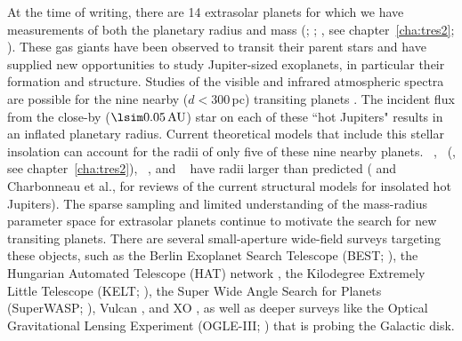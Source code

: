 At the time of writing, there are 14 extrasolar planets for which we have measurements of both the planetary radius and mass (\citealp*[see][for a review]{Charbonneau_Brown_Burrows:PPV:2007a}; \citealt{McCullough_Stys_Valenti:apj:2006a}; \citealt{ODonovan_Charbonneau_Mandushev:apjl:2006a}, see chapter~\ref{cha:tres2}; \citealt{Bakos_Noyes_Kovacs:apj:2007a, Collier-Cameron_Bouchy_Hebrard:MNRAS:2007a}). These gas giants have been observed to transit their parent stars and have supplied new opportunities to study Jupiter-sized exoplanets, in particular their formation and structure. Studies of the visible and infrared atmospheric spectra are possible for the nine nearby ($d<300$\,pc) transiting planets \citep{Charbonneau_Brown_Noyes:apj:2002a, Vidal-Madjar_Lecavelier-des-Etangs_Desert:nat:2003a, Deming_Brown_Charbonneau:apj:2005a, Deming_Seager_Richardson:nat:2005a, Charbonneau_Allen_Megeath:apj:2005a}.
The incident flux from the close-by (\mbox{$\lsim0.05\,\mathrm{AU}$}) star on each of these ``hot Jupiters" results in an inflated planetary radius. Current theoretical models that include this stellar insolation can account for the radii of only five of these nine nearby planets. \hdTZNb\ \citep{Charbonneau_Brown_Latham:apjl:2000a, Henry_Marcy_Butler:apj:2000a}, \tresTwo\ (\citealp{ODonovan_Charbonneau_Mandushev:apjl:2006a}, see chapter~\ref{cha:tres2}), \hatponeb\ \citep{Bakos_Noyes_Kovacs:apj:2007a}, and \wasponeb\ \citep{Collier-Cameron_Bouchy_Hebrard:MNRAS:2007a} have radii larger than predicted (\citealp[see][]{Laughlin_Wolf_Vanmunster:apj:2005a} and Charbonneau et al., \citeyear{Charbonneau_Brown_Burrows:PPV:2007a} for reviews of the current structural models for insolated hot Jupiters). 
The sparse sampling and limited understanding of the mass-radius parameter space for extrasolar planets continue to motivate the search for new transiting planets. There are several small-aperture wide-field surveys targeting these objects, such as the Berlin Exoplanet Search Telescope (BEST; \citealt{Rauer_Eisloffel_Erikson:pasp:2004a}), the Hungarian Automated Telescope (HAT) network \citep{Bakos_Lazar_Papp:pasp:2002a, Bakos_Noyes_Kovacs:pasp:2004a}, the Kilodegree Extremely Little Telescope (KELT; \citealt*{Pepper_Gould_Depoy:AIP:2004a}), the Super Wide Angle Search for Planets (SuperWASP; \citealt{Street_Pollaco_Fitzsimmons:ASP:2003a}), Vulcan \citep{Borucki_Caldwell_Koch:pasp:2001a}, and XO \citep{McCullough_Stys_Valenti:pasp:2005a}, as well as deeper surveys like the Optical Gravitational Lensing Experiment (OGLE-III; \citealt{Udalski_Paczynski_Zebrun:acta:2002a}) that is probing the Galactic disk. 


